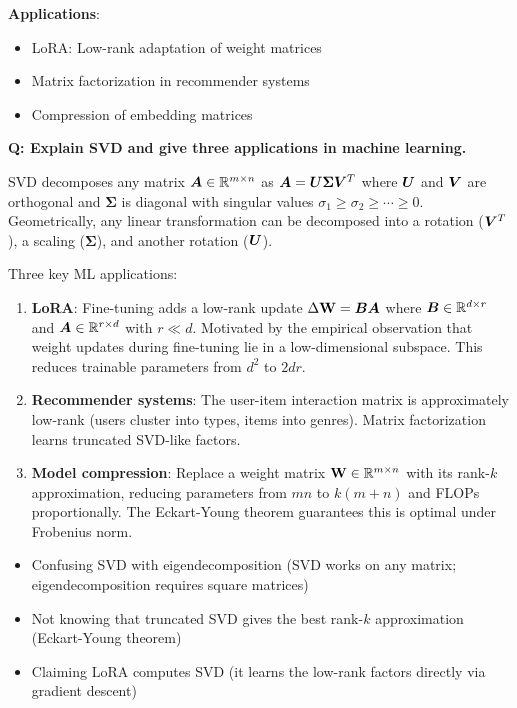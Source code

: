 \textbf{Applications}:
\begin{itemize}
    \item LoRA: Low-rank adaptation of weight matrices
    \item Matrix factorization in recommender systems
    \item Compression of embedding matrices
\end{itemize}

\begin{interviewq}
\textbf{Q: Explain SVD and give three applications in machine learning.}

 \quad {} \quad \badgefreq{\freqhigh}

\stronganswer
SVD decomposes any matrix $\bm{A} \in \mathbb{R}^{m \times n}$ as $\bm{A} = \bm{U} \bm{\Sigma} \bm{V}^T$ where $\bm{U}$ and $\bm{V}$ are orthogonal and $\bm{\Sigma}$ is diagonal with singular values $\sigma_1 \geq \sigma_2 \geq \cdots \geq 0$. Geometrically, any linear transformation can be decomposed into a rotation ($\bm{V}^T$), a scaling ($\bm{\Sigma}$), and another rotation ($\bm{U}$).

Three key ML applications:
\begin{enumerate}
    \item \textbf{LoRA}: Fine-tuning adds a low-rank update $\Delta \mathbf{W} = \bm{B} \bm{A}$ where $\bm{B} \in \mathbb{R}^{d \times r}$ and $\bm{A} \in \mathbb{R}^{r \times d}$ with $r \ll d$. Motivated by the empirical observation that weight updates during fine-tuning lie in a low-dimensional subspace. This reduces trainable parameters from $d^2$ to $2dr$.
    \item \textbf{Recommender systems}: The user-item interaction matrix is approximately low-rank (users cluster into types, items into genres). Matrix factorization learns truncated SVD-like factors.
    \item \textbf{Model compression}: Replace a weight matrix $\mathbf{W} \in \mathbb{R}^{m \times n}$ with its rank-$k$ approximation, reducing parameters from $mn$ to $k(m+n)$ and FLOPs proportionally. The Eckart-Young theorem guarantees this is optimal under Frobenius norm.
\end{enumerate}

\redflags
\begin{itemize}
    \item Confusing SVD with eigendecomposition (SVD works on any matrix; eigendecomposition requires square matrices)
    \item Not knowing that truncated SVD gives the best rank-$k$ approximation (Eckart-Young theorem)
    \item Claiming LoRA computes SVD (it learns the low-rank factors directly via gradient descent)
\end{itemize}


\end{interviewq}
